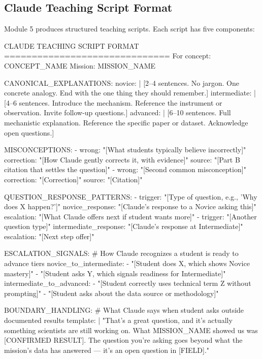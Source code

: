 \documentclass[11pt,letterpaper]{article}
\begin{document}
\subsection{Claude Teaching Script Format}

Module 5 produces structured teaching scripts. Each script has five components:

\begin{asciibox}
CLAUDE TEACHING SCRIPT FORMAT
==============================
For concept: {CONCEPT_NAME}
Mission: {MISSION_NAME}

CANONICAL_EXPLANATIONS:
  novice: |
    [2–4 sentences. No jargon. One concrete analogy.
     End with the one thing they should remember.]
  intermediate: |
    [4–6 sentences. Introduce the mechanism. Reference the
     instrument or observation. Invite follow-up questions.]
  advanced: |
    [6–10 sentences. Full mechanistic explanation. Reference
     the specific paper or dataset. Acknowledge open questions.]

MISCONCEPTIONS:
  - wrong: "[What students typically believe incorrectly]"
    correction: "[How Claude gently corrects it, with evidence]"
    source: "[Part B citation that settles the question]"
  - wrong: "[Second common misconception]"
    correction: "[Correction]"
    source: "[Citation]"

QUESTION_RESPONSE_PATTERNS:
  - trigger: "[Type of question, e.g., 'Why does X happen?']"
    novice_response: "[Claude's response to a Novice asking this]"
    escalation: "[What Claude offers next if student wants more]"
  - trigger: "[Another question type]"
    intermediate_response: "[Claude's response at Intermediate]"
    escalation: "[Next step offer]"

ESCALATION_SIGNALS:
  # How Claude recognizes a student is ready to advance tiers
  novice_to_intermediate:
    - "[Student does X, which shows Novice mastery]"
    - "[Student asks Y, which signals readiness for Intermediate]"
  intermediate_to_advanced:
    - "[Student correctly uses technical term Z without prompting]"
    - "[Student asks about the data source or methodology]"

BOUNDARY_HANDLING:
  # What Claude says when student asks outside documented results
  template: |
    "That's a great question, and it's actually something scientists
    are still working on. What {MISSION_NAME} showed us was [CONFIRMED
    RESULT]. The question you're asking goes beyond what the mission's
    data has answered — it's an open question in [FIELD]."
\end{asciibox}
\end{document}
